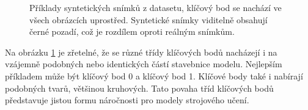 \begin{figure}[H]
\hspace{\hspacesize}%
\hspace{\hspacesize}%
\subfloat{%
  \hspace{\imagewidth}
}

\caption[Příklady syntetických snímků z datasetu]{Příklady syntetických snímků z datasetu, klíčový bod se nachází ve všech obrázcích uprostřed. Syntetické snímky viditelně obsahují černé pozadí, což je rozdílem oproti reálným snímkům. }
\label{fig:synthetic_images}
\end{figure}

Na obrázku \ref{fig:synthetic_images} je zřetelné, že se různé třídy klíčových bodů nacházejí i na vzájemně podobných nebo identických částí stavebnice modelu. Nejlepším příkladem může být klíčový bod 0 a klíčový bod 1. Klíčové body také i nabírají podobných tvarů, většinou kruhových. Tato povaha tříd klíčových bodů představuje jistou formu náročnosti pro modely strojového učení.

\endinput
